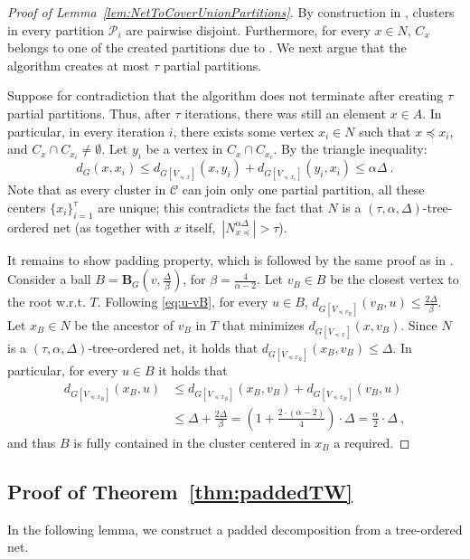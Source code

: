 \documentclass{theoretics}
\def\cP{\ensuremath{\mathcal{P}}}
\def\ball{\mathbf{B}}
\def\cC{\ensuremath{\mathcal{C}}}
\begin{document}
\begin{proof}[Proof of Lemma~\ref{lem:NetToCoverUnionPartitions}]
	By construction in , clusters in every partition $\cP_i$ are pairwise disjoint. Furthermore, for every $x\in N$, $C_x$ belongs to one of the created partitions due to .  We next argue that the algorithm creates at most $\tau$ partial partitions.
	
	Suppose for contradiction that the algorithm does not terminate after creating  $\tau$ partial partitions. Thus, after $\tau$ iterations, there was still an element $x\in A$. In particular, in every iteration $i$, there exists some vertex $x_i \in N$ such that $x\preceq x_i$, and $C_x\cap C_{x_i}\not=\emptyset$. 
	Let $y_i$ be  a vertex in $C_x\cap C_{x_i}$.  By the triangle inequality:
	\begin{equation*}
		d_{G}(x,x_{i})\le d_{G[V_{\preceq x}]}(x,y_{i})+d_{G[V_{\preceq x_{i}}]}(y_{i},x_{i})\le\alpha\Delta~.
	\end{equation*}
	Note that as every cluster in $\cC$ can join only one partial partition, all these centers $\{x_i\}_{i=1}^{\tau}$ are unique; this contradicts the fact that $N$ is a $(\tau,\alpha,\Delta)$-tree-ordered net (as together with $x$ itself,~$\left|N_{x\preceq}^{\alpha\Delta}\right|>\tau$). 
	
	It remains to show padding property, which is followed by the same proof as in .
	Consider a ball $B=\ball_G(v,\frac{\Delta}{\beta})$, for $\beta=\frac{4}{\alpha-2}$. Let $v_B\in B$ be the closest vertex to the root w.r.t. $T$. Following \cref{eq:u-vB},  for every $u\in B$, $d_{G[V_{\preceq v_B}]}(v_B,u)\le \frac{2\Delta}{\beta}$.
	Let $x_B\in N$ be the ancestor of $v_B$ in $T$ that minimizes $d_{G[V_{\preceq x}]}(x,v_B)$. Since $N$ is a $(\tau,\alpha,\Delta)$-tree-ordered net, it holds that $d_{G[V_{\preceq x_B}]}(x_B,v_B)\le\Delta$. In particular, for every $u\in B$ it holds that 
	\begin{align*}
		d_{G[V_{\preceq x_{B}}]}(x_{B},u) & \le d_{G[V_{\preceq x_{B}}]}(x_{B},v_{B})+d_{G[V_{\preceq x_{B}}]}(v_{B},u)\\
		& \le\Delta+\frac{2\Delta}{\beta}=\left(1+\frac{2\cdot(\alpha-2)}{4}\right)\cdot\Delta=\frac{\alpha}{2}\cdot\Delta~,
	\end{align*}
	and thus $B$ is fully contained in the cluster centered in $x_B$ a required.
\end{proof}




\subsection{Proof of Theorem~\ref{thm:paddedTW}}
In the following lemma, we construct a padded decomposition from a tree-ordered net. 
\end{document}
